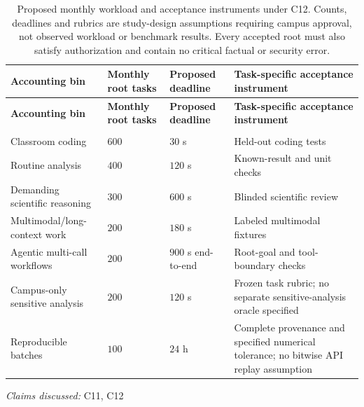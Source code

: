 \documentclass[11pt]{article}
\begin{document}
\begin{landscape}
\small
\begin{longtable}{@{}>{\raggedright\arraybackslash}p{}>{\raggedleft\arraybackslash}p{}>{\raggedright\arraybackslash}p{}>{\raggedright\arraybackslash}p{}@{}}
\caption{Proposed monthly workload and acceptance instruments under C12. Counts, deadlines and rubrics are study-design assumptions requiring campus approval, not observed workload or benchmark results. Every accepted root must also satisfy authorization and contain no critical factual or security error.}\\
\toprule
\textbf{Accounting bin} & \textbf{Monthly root tasks} & \textbf{Proposed deadline} & \textbf{Task-specific acceptance instrument}\\
\midrule
\endfirsthead
\toprule
\textbf{Accounting bin} & \textbf{Monthly root tasks} & \textbf{Proposed deadline} & \textbf{Task-specific acceptance instrument}\\
\midrule
\endhead
\midrule
\multicolumn{4}{r}{\footnotesize Continued on next page}\\
\endfoot
\bottomrule
\endlastfoot
Classroom coding & $600$ & $30$ s & Held-out coding tests\\
Routine analysis & $400$ & $120$ s & Known-result and unit checks\\
Demanding scientific reasoning & $300$ & $600$ s & Blinded scientific review\\
Multimodal/long-context work & $200$ & $180$ s & Labeled multimodal fixtures\\
Agentic multi-call workflows & $200$ & $900$ s end-to-end & Root-goal and tool-boundary checks\\
Campus-only sensitive analysis & $200$ & $120$ s & Frozen task rubric; no separate sensitive-analysis oracle specified\\
Reproducible batches & $100$ & $24$ h & Complete provenance and specified numerical tolerance; no bitwise API replay assumption\\
\end{longtable}
\par{}
\end{landscape}
\textit{Claims discussed: }C11, C12
\end{document}
